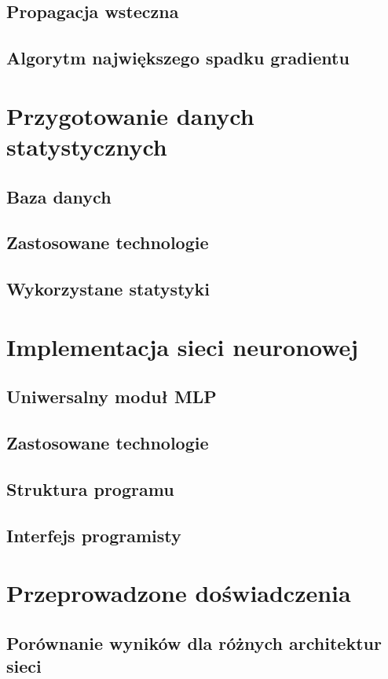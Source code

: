 \section{Propagacja wsteczna}
\section{Algorytm największego spadku gradientu}

\chapter{Przygotowanie danych statystycznych}
\section{Baza danych}
\section{Zastosowane technologie}
\section{Wykorzystane statystyki}

\chapter{Implementacja sieci neuronowej}
\section{Uniwersalny moduł MLP}
\section{Zastosowane technologie}
\section{Struktura programu}
\section{Interfejs programisty}

\chapter{Przeprowadzone doświadczenia}
\section{Porównanie wyników dla różnych architektur sieci}

